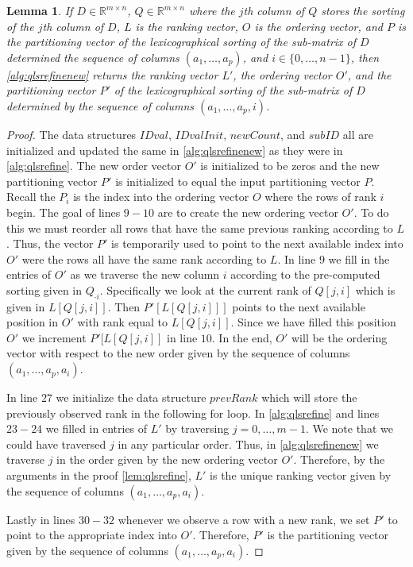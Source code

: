\documentclass[a4paper,10pt,reqno]{amsart}
\newcommand\R{\mathbb R}
\newtheorem{lemma}{Lemma}
\theoremstyle{definition}
\begin{document}
\begin{lemma} 
\label{lem:qlsrefinenew}
If $D \in \R^{m \times n}$, $Q \in \R^{m \times n}$ where the $j$th column of
$Q$ stores the sorting of the $j$th column of $D$, $L$ is the ranking vector,
$O$ is the ordering vector, and $P$ is the partitioning vector of the
lexicographical sorting of the sub-matrix of $D$ determined the sequence of
columns $(a_1,\ldots,a_p)$, and $i \in \{0,\ldots,n-1\}$, then
\autoref{alg:qlsrefinenew} returns the ranking vector $L'$, the ordering vector
$O'$, and the partitioning vector $P'$ of the lexicographical sorting of the
sub-matrix of $D$ determined by the sequence of columns $(a_1,\ldots,a_p,i)$.
\end{lemma}
\begin{proof}
The data structures $IDval$, $IDvalInit$, $newCount$, and $subID$ all are
initialized and updated the same in \autoref{alg:qlsrefinenew} as they were in
\autoref{alg:qlsrefine}. The new order vector $O'$ is initialized to be zeros
and the new partitioning vector $P'$ is initialized to equal the input
partitioning vector $P$. Recall the $P_i$ is the index into the ordering vector
$O$ where the rows of rank $i$ begin. The goal of lines $9-10$ are to create
the new ordering vector $O'$. To do this we must reorder all rows that have the
same previous ranking according to $L$. Thus, the vector $P'$ is temporarily
used to point to the next available index into $O'$ were the rows all have the
same rank according to $L$. In line $9$ we fill in the entries of $O'$ as we
traverse the new column $i$ according to the pre-computed sorting given in
$Q_{\cdot i}$. Specifically we look at the current rank of $Q[j,i]$ which is
given in $L[Q[j,i]]$. Then $P'[L[Q[j,i]]]$ points to the next available
position in $O'$ with rank equal to $L[Q[j,i]]$. Since we have filled this
position $O'$ we increment $P'[L[Q[j,i]]$ in line $10$. In the end, $O'$ will
be the ordering vector with respect to the new order given by the sequence
of columns $(a_1,\ldots,a_p,a_i)$.

In line $27$ we initialize the data structure $prevRank$ which will store the
previously observed rank in the following for loop.  In \autoref{alg:qlsrefine}
and lines $23-24$ we filled in entries of $L'$ by traversing $j=0,\ldots,m-1$.
We note that we could have traversed $j$ in any particular order. Thus, in
\autoref{alg:qlsrefinenew} we traverse $j$ in the order given by the new
ordering vector $O'$.  Therefore, by the arguments in the proof
\autoref{lem:qlsrefine}, $L'$ is the unique ranking vector given by the
sequence of columns $(a_1,\ldots,a_p,a_i)$. 

Lastly in lines $30-32$ whenever we observe a row with a new rank, we set $P'$
to point to the appropriate index into $O'$. Therefore, $P'$ is the 
partitioning vector given by the sequence of columns $(a_1,\ldots,a_p,a_i)$.

\end{proof}
\end{document}
